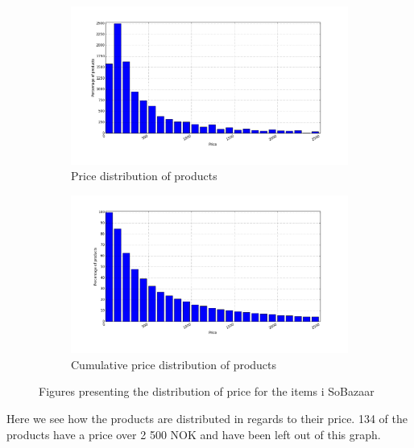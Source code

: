     \begin{figure}[H]
        \centering
        \begin{subfigure}{.5\textwidth}
            \includegraphics[width=\dualGraphWidth]{image/priceDistributiondistribution.png}
            \centering
            \caption{Price distribution of products}
    \label{figure:pricePerProduct}
        \end{subfigure}%
        \begin{subfigure}{.5\textwidth}
            \includegraphics[width=\dualGraphWidth]{image/cumpriceDistributiondistribution.png}
            \centering
            \caption{Cumulative price distribution of products}
    \label{figure:pricePerProductCum}
        \end{subfigure}
        \caption{Figures presenting the distribution of price for the items i SoBazaar}
    \end{figure}
        Here we see how the products are distributed in regards to their price.
        134 of the products have a price over 2 500 NOK and have been left out of this graph.

